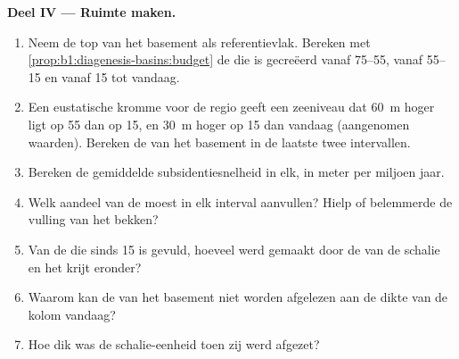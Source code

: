\begin{problem}
\noindent\textbf{Deel IV --- Ruimte maken.}
\begin{enumerate}[resume]
  \item Neem de top van het basement als referentievlak. Bereken met \cref{prop:b1:diagenesis-basins:budget} de  die is gecreëerd vanaf \qtyrange{75}{55}{\Ma}, vanaf \qtyrange{55}{15}{\Ma} en vanaf \qty{15}{\Ma} tot vandaag.
  \item Een eustatische kromme voor de regio geeft een zeeniveau dat \qty{60}{m} hoger ligt op \qty{55}{\Ma} dan op \qty{15}{\Ma}, en \qty{30}{m} hoger op \qty{15}{\Ma} dan vandaag (aangenomen waarden). Bereken de  van het basement in de laatste twee intervallen.
  \item Bereken de gemiddelde subsidentiesnelheid in elk, in meter per miljoen jaar.
  \item Welk aandeel van de  moest  in elk interval aanvullen? Hielp of belemmerde  de vulling van het bekken?
  \item Van de  die sinds \qty{15}{\Ma} is gevuld, hoeveel werd gemaakt door de  van de schalie en het krijt eronder?
  \item Waarom kan de  van het basement niet worden afgelezen aan de dikte van de kolom vandaag?
  \item Hoe dik was de schalie-eenheid toen zij werd afgezet?
\end{enumerate}
\end{problem}
